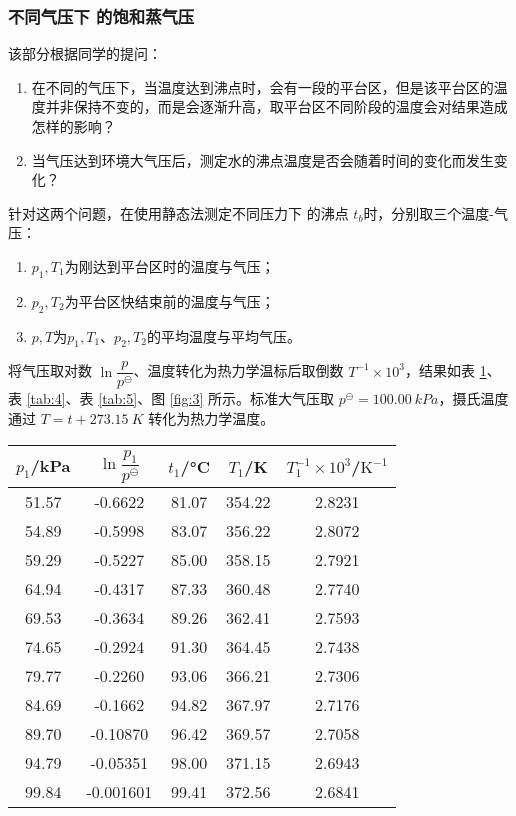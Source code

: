 \subsubsection{不同气压下  的饱和蒸气压}

该部分根据同学的提问：
\begin{enumerate}
    \item 在不同的气压下，当温度达到沸点时，会有一段的平台区，但是该平台区的温度并非保持不变的，而是会逐渐升高，取平台区不同阶段的温度会对结果造成怎样的影响？
    \item 当气压达到环境大气压后，测定水的沸点温度是否会随着时间的变化而发生变化？
\end{enumerate}

针对这两个问题，在使用静态法测定不同压力下  的沸点 \(t_b\)时，分别取三个温度-气压：
\begin{enumerate}
    \item $p_1,T_1$为刚达到平台区时的温度与气压；
    \item $p_2,T_2$为平台区快结束前的温度与气压；
    \item $p,T$为$p_1,T_1$、$p_2,T_2$的平均温度与平均气压。
\end{enumerate}
将气压取对数 \(\ln \dfrac{p}{p^\ominus}\)、温度转化为热力学温标后取倒数 \(T^{-1}\times10^{3}\)，结果如表 \ref{tab:3}、表 \ref{tab:4}、表 \ref{tab:5}、图 \ref{fig:3} 所示。标准大气压取 \(p^\ominus=100.00\si{~kPa}\)，摄氏温度通过 \(T = t + 273.15\si{~K}\) 转化为热力学温度。

\begin{table}[htbp]
    \centering
    \begin{tabular}{ccccc}
        \toprule
        $p_1$/\si{kPa} & $\ln\dfrac{p_1}{p^\ominus}$ & $t_1$/\si{\celsius} & $T_1$/\si{K} & $T_1^{-1}\times10^{3} $/$\mathrm{K^{-1}}$ \\
        \midrule
        51.57 & -0.6622 & 81.07 & 354.22 & 2.8231 \\
        54.89 & -0.5998 & 83.07 & 356.22 & 2.8072 \\
        59.29 & -0.5227 & 85.00 & 358.15 & 2.7921 \\
        64.94 & -0.4317 & 87.33 & 360.48 & 2.7740 \\
        69.53 & -0.3634 & 89.26 & 362.41 & 2.7593 \\
        74.65 & -0.2924 & 91.30 & 364.45 & 2.7438 \\
        79.77 & -0.2260 & 93.06 & 366.21 & 2.7306 \\
        84.69 & -0.1662 & 94.82 & 367.97 & 2.7176 \\
        89.70 & -0.10870 & 96.42 & 369.57 & 2.7058 \\
        94.79 & -0.05351 & 98.00 & 371.15 & 2.6943 \\
        99.84 & -0.001601 & 99.41 & 372.56 & 2.6841 \\
        \bottomrule
        \end{tabular}
    \label{tab:3}
\end{table}

